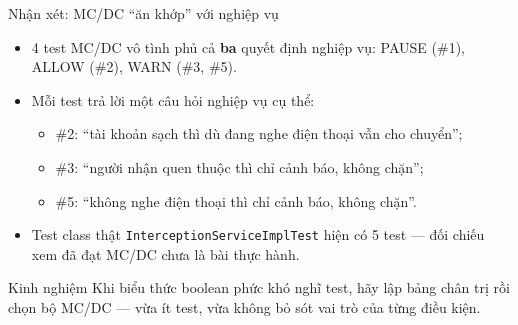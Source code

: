 \documentclass[aspectratio=169,12pt]{beamer}
\begin{document}
\begin{frame}{Nhận xét: MC/DC ``ăn khớp'' với nghiệp vụ}
  \begin{itemize}
    \item 4 test MC/DC vô tình phủ cả \textbf{ba} quyết định nghiệp vụ:
          PAUSE (\#1), ALLOW (\#2), WARN (\#3, \#5).
    \item Mỗi test trả lời một câu hỏi nghiệp vụ cụ thể:
    \begin{itemize}
      \item \#2: ``tài khoản sạch thì dù đang nghe điện thoại vẫn cho chuyển'';
      \item \#3: ``người nhận quen thuộc thì chỉ cảnh báo, không chặn'';
      \item \#5: ``không nghe điện thoại thì chỉ cảnh báo, không chặn''.
    \end{itemize}
    \item Test class thật \texttt{InterceptionServiceImplTest} hiện có
          5 test --- đối chiếu xem đã đạt MC/DC chưa là bài thực hành.
  \end{itemize}

  \begin{block}{Kinh nghiệm}
    Khi biểu thức boolean phức khó nghĩ test, hãy lập bảng chân trị rồi
    chọn bộ MC/DC --- vừa ít test, vừa không bỏ sót vai trò của
    từng điều kiện.
  \end{block}
\end{frame}
\end{document}
